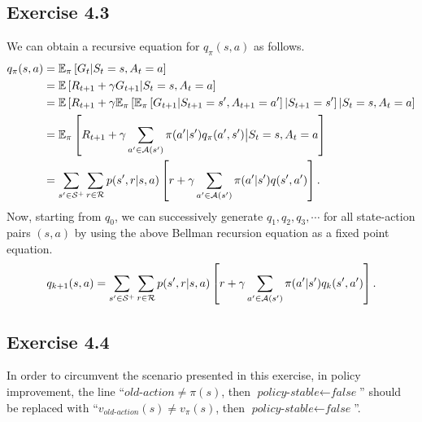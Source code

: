 \documentclass[10pt]{article}
\begin{document}
	 \subsection*{Exercise 4.3}
	 \label{ss:4.3}
	 We can obtain a recursive equation for $q_\pi(s,a)$ as follows.
	 \begin{align*}
	 q_\pi(s,a) &= \mathbb{E}_\pi \left[ G_t | S_t=s, A_t = a\right]\\
	 &= \mathbb{E}\left[ R_{t+1} + \gamma G_{t+1} | S_t = s, A_t = a \right]\\
	 &= \mathbb{E} \left[ R_{t+1} + \gamma \mathbb{E}_\pi \left[ \mathbb{E}_\pi \left[ G_{t+1} | S_{t+1}=s', A_{t+1}=a' \right] | S_{t+1} = s' \right] | S_t = s, A_t = a \right]\\
	 &= \mathbb{E}_\pi \left[ R_{t+1} + \gamma \sum_{a'\in\mathcal{A}(s')} \pi(a'|s') q_\pi(a',s') \big| S_t =s, A_t = a \right]\\
	 &= \sum_{s'\in\mathcal{S}^+} \sum_{r\in\mathcal{R}} p(s',r|s,a) \left[ r + \gamma \sum_{a'\in\mathcal{A}(s')} \pi(a'|s')q(s',a') \right].
	 \end{align*}
	 Now, starting from $q_0$, we can successively generate $q_1,q_2,q_3,\cdots$ for all state-action pairs $(s,a)$ by using the above Bellman recursion equation as a fixed point equation.
	 \begin{align*}
	 q_{k+1}(s,a) = \sum_{s'\in\mathcal{S}^+} \sum_{r\in\mathcal{R}} p(s',r|s,a) \left[ r + \gamma \sum_{a'\in\mathcal{A}(s')} \pi(a'|s') q_k(s',a') \right].
	 \end{align*}
	 \subsection*{Exercise 4.4}
	 \label{ss:4.4}
	 In order to circumvent the scenario presented in this exercise, in policy improvement, the line ``$\textit{old-action} \neq \pi(s)$, then $\textit{policy-stable} \leftarrow \textit{false}$'' should be replaced with ``$v_{\textit{old-action}}(s) \neq v_\pi(s)$, then $\textit{policy-stable} \leftarrow \textit{false}$''.
\end{document}

